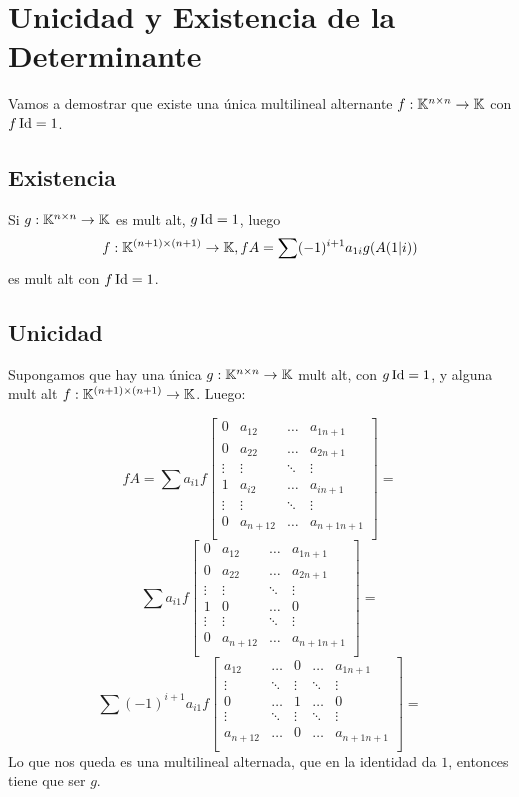 \documentclass{article}
\begin{document}
\section*{Unicidad y Existencia de la Determinante}
Vamos a demostrar que existe una única multilineal alternante $f : \mathbb{K}^{n \times n} \to \mathbb{K}$ con $f \operatorname{Id} = 1$.

\subsection*{Existencia}
Si $g : \mathbb{K}^{n \times n} \to \mathbb{K}$ es mult alt, $g \operatorname{Id} = 1$, luego 
\[f : \mathbb{K}^{(n+1) \times (n+1)} \to \mathbb{K}, fA = \sum (-1)^{i+1} a_{1i}g(A(1|i))\]
es mult alt con $f \operatorname{Id} = 1$.

\subsection*{Unicidad}
Supongamos que hay una única $g : \mathbb{K}^{n \times n} \to \mathbb{K}$ mult alt, con $g \operatorname{Id} = 1$, y alguna mult alt $f : \mathbb{K}^{(n+1) \times (n+1)} \to \mathbb{K}$. Luego:

\[fA =
	\sum a_{i1} f 
	\begin{bmatrix}
		0 & a_{12} & \dots & a_{1n+1} \\
		0 & a_{22} & \dots & a_{2n+1} \\
		\vdots & \vdots & \ddots & \vdots \\
		1 & a_{i2} & \dots & a_{in+1} \\
		\vdots & \vdots & \ddots & \vdots \\
		0 & a_{n+12} & \dots & a_{n+1n+1} \\
	\end{bmatrix} =\]\[ 
	\sum a_{i1} f 
	\begin{bmatrix}
		0 & a_{12} & \dots & a_{1n+1} \\
		0 & a_{22} & \dots & a_{2n+1} \\
		\vdots & \vdots & \ddots & \vdots \\
		1 & 0 & \dots & 0 \\
		\vdots & \vdots & \ddots & \vdots \\
		0 & a_{n+12} & \dots & a_{n+1n+1} \\
	\end{bmatrix} =  \]\[
	\sum (-1)^{i+1} a_{i1} f 
	\begin{bmatrix}
		a_{12} & \dots &0& \dots & a_{1n+1} \\
		\vdots & \ddots & \vdots & \ddots & \vdots \\
		0 & \dots & 1 & \dots& 0 \\
		\vdots & \ddots & \vdots & \ddots & \vdots \\
		a_{n+12} & \dots & 0 & \dots & a_{n+1n+1} \\
	\end{bmatrix} = 
\]
Lo que nos queda es una multilineal alternada, que en la identidad da $1$, entonces tiene que ser $g$.
\end{document}
